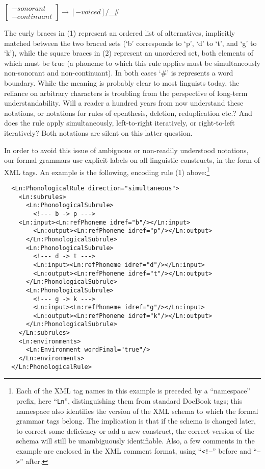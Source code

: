 \ea  $\left[
      \begin{array}{l}
           -\mathit{sonorant}\\
           -\mathit{continuant}
      \end{array}
      \right]
    \rightarrow 
      [-\mathit{voiced}]\mathrm{/\_\_\#}$
\z

The curly braces in (1) represent an ordered list of alternatives, implicitly matched between the two braced sets (`b' corresponds to `p', `d' to `t', and `g' to `k'), while the square braces in (2) represent an unordered set, both elements of which must be true (a phoneme to which this rule applies must be simultaneously non-sonorant and non-continuant). In both cases `\#' is represents a word boundary. While the meaning is probably clear to most linguists today, the reliance on arbitrary characters is troubling from the perspective of long-term understandability. Will a reader a hundred years from now understand these notations, or notations for rules of epenthesis, deletion, reduplication etc.? And does the rule apply simultaneously, left-to-right iteratively, or right-to-left iteratively? Both notations are silent on this latter question.

In order to avoid this issue of ambiguous or non-readily understood notations, our formal grammars use explicit labels on all linguistic constructs, in the form of XML tags. An example is the following, encoding rule (1) above:\footnote{Each
  of the XML tag names in this example is preceded by a ``namespace'' prefix, here ``\texttt{Ln}'', distinguishing them from standard DocBook tags; this namespace also identifies the version of the XML schema to which the formal grammar tags belong. The implication is that if the schema is changed later, to correct some deficiency or add a new construct, the correct version of the schema will still be unambiguously identifiable. Also, a few comments in the example are enclosed in the XML comment format, using ``\texttt{{\textless}!---}'' before and ``\texttt{---{\textgreater}}'' after.
}
\ea
\begin{verbatim}
  <Ln:PhonologicalRule direction="simultaneous">
    <Ln:subrules>
      <Ln:PhonologicalSubrule>
        <!--- b -> p --->
    <Ln:input><Ln:refPhoneme idref="b"/></Ln:input>
        <Ln:output><Ln:refPhoneme idref="p"/></Ln:output>
      </Ln:PhonologicalSubrule>
      <Ln:PhonologicalSubrule>
        <!--- d -> t --->
        <Ln:input><Ln:refPhoneme idref="d"/></Ln:input>
        <Ln:output><Ln:refPhoneme idref="t"/></Ln:output>
      </Ln:PhonologicalSubrule>
      <Ln:PhonologicalSubrule>
        <!--- g -> k --->
        <Ln:input><Ln:refPhoneme idref="g"/></Ln:input>
        <Ln:output><Ln:refPhoneme idref="k"/></Ln:output>
      </Ln:PhonologicalSubrule>
    </Ln:subrules>
    <Ln:environments>
      <Ln:Environment wordFinal="true"/>
    </Ln:environments>
  </Ln:PhonologicalRule>
\end{verbatim}
\z

